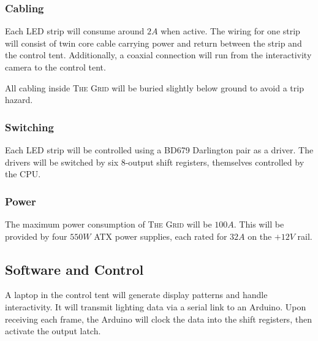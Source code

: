 \documentclass[12pt]{article} %
\begin{document}
\subsubsection{Cabling}
Each LED strip will consume around $2A$ when active.  The wiring for one strip will consist of twin core cable carrying power and return between the strip and the control tent.  Additionally, a coaxial connection will run from the interactivity camera to the control tent.

All cabling inside \textsc{The Grid} will be buried slightly below ground to avoid a trip hazard.

\subsubsection{Switching}
Each LED strip will be controlled using a BD679 Darlington pair as a driver.  The drivers will be switched by six 8-output shift registers, themselves controlled by the CPU.

\subsubsection{Power}
The maximum power consumption of \textsc{The Grid} will be $100A$.  This will be provided by four $550W$ ATX power supplies, each rated for $32A$ on the $+12V$ rail.

\subsection{Software and Control}
A laptop in the control tent will generate display patterns and handle interactivity.  It will transmit lighting data via a serial link to an Arduino.  Upon receiving each frame, the Arduino will clock the data into the shift registers, then activate the output latch.
\end{document}
